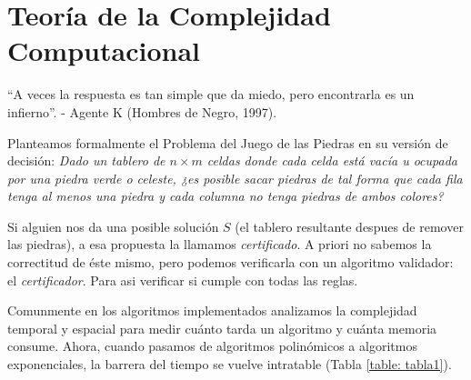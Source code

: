 \section{Teoría de la Complejidad Computacional}

``A veces la respuesta es tan simple que da miedo, pero encontrarla es un infierno''. - Agente K (Hombres de Negro, 1997).

Planteamos formalmente el Problema del Juego de las Piedras en su versión de decisión: \textit{Dado un tablero de $n \times m$ celdas donde cada celda está vacía u ocupada por una piedra verde o celeste, ¿es posible sacar piedras de tal forma que cada fila tenga al menos una piedra y cada columna no tenga piedras de ambos colores?}

Si alguien nos da una posible solución $S$ (el tablero resultante despues de remover las piedras), a esa propuesta la llamamos \textit{certificado}. A priori no sabemos la correctitud de éste mismo, pero podemos verificarla con un algoritmo validador: el \textit{certificador}. Para asi verificar si cumple con todas las reglas.

Comunmente en los algoritmos implementados analizamos la complejidad temporal y espacial para medir cuánto tarda un algoritmo y cuánta memoria consume. Ahora, cuando pasamos de algoritmos polinómicos a algoritmos exponenciales, la barrera del tiempo se vuelve intratable (Tabla \ref{table: tabla1}).

